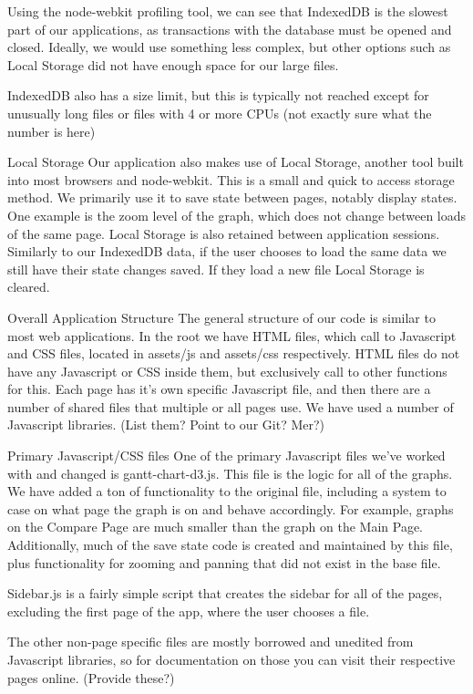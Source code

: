 \documentclass{hmcclinic}
\begin{document}
  Using the node-webkit profiling tool, we can see that IndexedDB is the slowest part of our applications, as transactions with the database must be opened and closed. Ideally, we would use something less complex, but other options such as Local Storage did not have enough space for our large files.

  IndexedDB also has  a size limit, but this is typically not reached except for unusually long files or files with 4 or more CPUs (not exactly sure what the number is here)

  Local Storage
  Our application also makes use of Local Storage, another tool built into most browsers and node-webkit. This is a small and quick to access storage method. We primarily use it to save state between pages, notably display states. One example is the zoom level of the graph, which does not change between loads of the same page. Local Storage is also retained between application sessions. Similarly to our IndexedDB data, if the user chooses to load the same data we still have their state changes saved. If they load a new file Local Storage is cleared.

  Overall Application Structure 
  The general structure of our code is similar to most web applications. In the root we have HTML files, which call to Javascript and CSS files, located in assets/js and assets/css respectively. HTML files do not have any Javascript or CSS inside them, but exclusively call to other functions for this. Each page has it’s own specific Javascript file, and then there are a number of shared files that multiple or all pages use. We have used a number of Javascript libraries. (List them? Point to our Git? Mer?)

  Primary Javascript/CSS files
  One of the primary Javascript files we’ve worked with and changed is gantt-chart-d3.js. This file is the logic for all of the graphs. We have added a ton of functionality to the original file, including a system to case on what page the graph is on and behave accordingly. For example, graphs on the Compare Page are much smaller than the graph on the Main Page. Additionally, much of the save state code is created and maintained by this file, plus functionality for zooming and panning that did not exist in the base file.

  Sidebar.js is a fairly simple script that creates the sidebar for all of the pages, excluding the first page of the app, where the user chooses a file.

  The other non-page specific files are mostly borrowed and unedited from Javascript libraries, so for documentation on those you can visit their respective pages online. (Provide these?)
\end{document}
